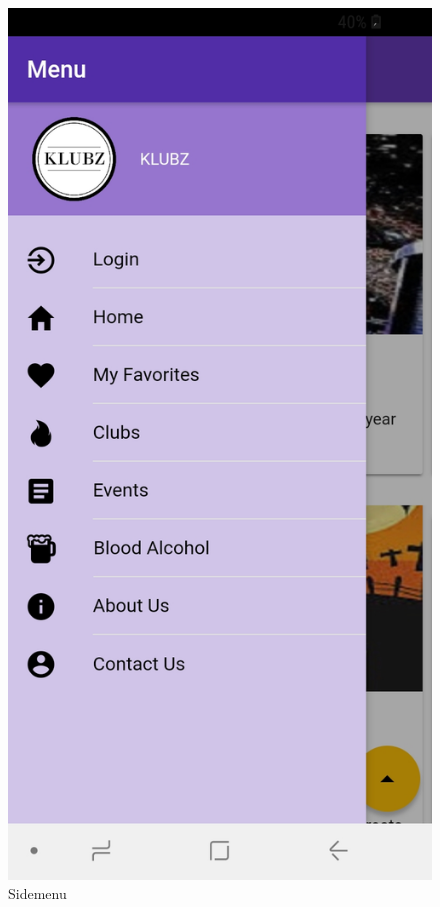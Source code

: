 \documentclass[12pt]{article}
\begin{document}
\begin{figure}[H]
  \includegraphics[width=\linewidth]{figures/Menu.jpg}
  \caption{Sidemenu}\label{fig:awesome_image3}
\endminipage
\end{figure}
\end{document}
